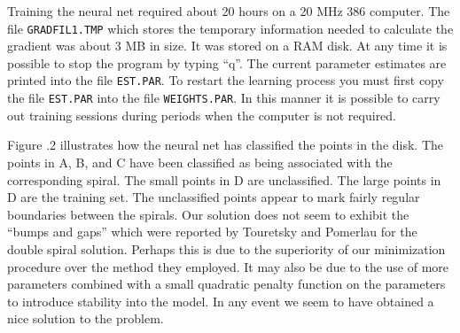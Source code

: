 \documentclass[12pt]{book}
\begin{document}
Training the neural net required about 20 hours on a 20 MHz 386
computer. The file {\tt GRADFIL1.TMP} which stores the temporary
information needed to calculate the gradient was about 3 MB in size.
It was stored on a RAM disk. At any time it is possible to stop
the program by typing ``q''. The current parameter estimates
are printed into the file {\tt EST.PAR}. To restart the learning
process you must first copy the file {\tt EST.PAR} into the
file {\tt WEIGHTS.PAR}. In this manner it is possible to 
carry out training sessions during periods when the computer is not required.
\bigbreak

\bigbreak
Figure \number\mychapno.2 illustrates how the neural net has classified the 
points in the disk. The points in A, B, and C have been classified
as being associated with the corresponding spiral. The small points in D
are unclassified. The large points in D are the training set. The unclassified 
points appear to mark fairly regular boundaries between the spirals. 
Our solution does not seem to exhibit the ``bumps and gaps''
which were reported by Touretsky and Pomerlau for the double spiral solution.
Perhaps this is due to the superiority of our minimization
procedure over the method they employed.
It may also be due to the use of more parameters combined with a 
small quadratic penalty 
function on the parameters to introduce stability into the model.
In any event we seem to have obtained a nice solution
to the problem.
\vfill\eject

\endchapter
\pagestyle{xxx}

\end{document}
